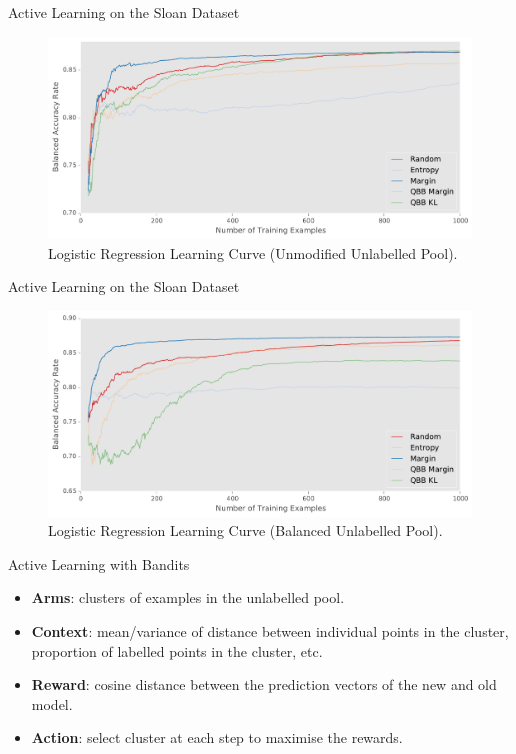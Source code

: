 \documentclass{beamer}
\begin{document}
\begin{frame}{Active Learning on the Sloan Dataset}
	\begin{figure}
		\centering
		\includegraphics[width=\textwidth]{images/active_logistic_random}
		\caption{Logistic Regression Learning Curve \footnotesize{(Unmodified Unlabelled Pool)}.}
	\end{figure}
\end{frame}



\begin{frame}{Active Learning on the Sloan Dataset}
	\begin{figure}
		\centering
		\includegraphics[width=\textwidth]{images/active_logistic_balanced}
		\caption{Logistic Regression Learning Curve \footnotesize{(Balanced Unlabelled Pool)}.}
	\end{figure}
\end{frame}

\begin{frame}{Active Learning with Bandits}
	\begin{itemize}
		\item \textbf{Arms}: clusters of examples in the unlabelled pool.
		\item \textbf{Context}: mean/variance of distance between individual points in the cluster,
		 proportion of labelled points in the cluster, etc.
		\item \textbf{Reward}: cosine distance between the prediction vectors
		of the new and old model.
		\item \textbf{Action}: select cluster at each step to maximise the rewards.
	\end{itemize}
\end{frame}
\end{document}
